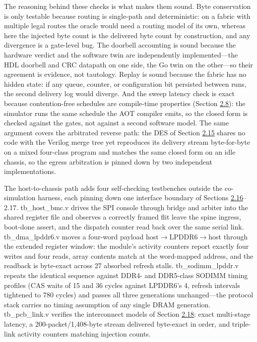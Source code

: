 \documentclass[10pt,twocolumn]{article}
\begin{document}
The reasoning behind these checks is what makes them sound. Byte conservation is only testable because routing is single-path and deterministic: on a fabric with multiple legal routes the oracle would need a routing model of its own, whereas here the injected byte count is the delivered byte count by construction, and any divergence is a gate-level bug. The doorbell accounting is sound because the hardware verdict and the software twin are independently implemented---the HDL doorbell and CRC datapath on one side, the Go twin on the other---so their agreement is evidence, not tautology. Replay is sound because the fabric has no hidden state: if any queue, counter, or configuration bit persisted between runs, the second delivery log would diverge. And the sweep latency check is exact because contention-free schedules are compile-time properties (Section \hyperref[sec:2.8]{2.8}): the simulator runs the same schedule the AOT compiler emits, so the closed form is checked against the gates, not against a second software model. The same argument covers the arbitrated reverse path: the DES of Section \hyperref[sec:2.15]{2.15} shares no code with the Verilog merge tree yet reproduces its delivery stream byte-for-byte on a mixed four-class program and matches the same closed form on an idle chassis, so the egress arbitration is pinned down by two independent implementations.

The host-to-chassis path adds four self-checking testbenches outside the co-simulation harness, each pinning down one interface boundary of Sections \hyperref[sec:2.16]{2.16}--2.17. tb\_host\_bmc.v drives the SPI console through bridge and arbiter into the shared register file and observes a correctly framed flit leave the spine ingress, boot-done assert, and the dispatch counter read back over the same serial link. tb\_dma\_lpddr6.v moves a four-word payload host$\to$LPDDR6$\to$host through the extended register window: the module's activity counters report exactly four writes and four reads, array contents match at the word-mapped address, and the readback is byte-exact across 27 absorbed refresh stalls. tb\_sodimm\_lpddr.v repeats the identical sequence against DDR4- and DDR5-class SODIMM timing profiles (CAS waits of 15 and 36 cycles against LPDDR6's 4, refresh intervals tightened to 780 cycles) and passes all three generations unchanged---the protocol stack carries no timing assumption of any single DRAM generation. tb\_pcb\_link.v verifies the interconnect models of Section \hyperref[sec:2.18]{2.18}: exact multi-stage latency, a 200-packet/1,408-byte stream delivered byte-exact in order, and triple-link activity counters matching injection counts.
\end{document}
